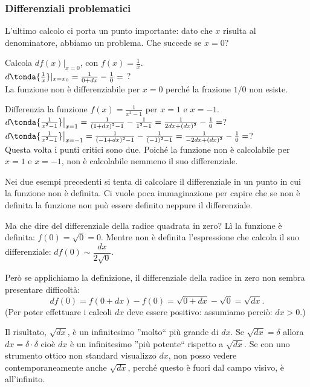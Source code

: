 \subsubsection{Differenziali problematici}
\label{subsubsec:diff01_diffproblemi}

L'ultimo calcolo ci porta un punto importante: dato che
$x$ risulta al denominatore, abbiamo un problema. Che succede se $x=0$?
\begin{esempio}
 Calcola $df(x)|_{x=0}$, con $f(x)=\frac{1}{x}$.\\
 $d\tonda{\frac{1}{x}}|_{x=x_0}=\frac{1}{0+dx}-\frac{1}{0}=$ ?\\
 La funzione non è differenziabile per $x=0$ perché la frazione \(1/0\) non 
esiste.
\end{esempio}

\begin{esempio}
Differenzia la funzione $f(x)=\frac{1}{x^2-1}$ per $x=1$ e $x=-1$.\\
$d\tonda{\frac{1}{x^2-1}}\big|_{x=1}=\frac{1}{(1+dx)^2-1}-\frac{1}{1^2-1}=
\frac{1}{2dx+(dx)^2}-\frac{1}{0}=$?\\
$d\tonda{\frac{1}{x^2-1}}\big|_{x=-1}=\frac{1}{(-1+dx)^2-1}-\frac{1}{(-1)^2-1}=
\frac{1}{-2dx+(dx)^2}-\frac{1}{0}=$?\\
Questa volta i punti critici sono due. Poiché la funzione non è calcolabile
per $x=1$ e $x=-1$, non è calcolabile nemmeno il suo differenziale.
\end{esempio}

Nei due esempi precedenti si tenta di calcolare il differenziale in un 
punto in cui la funzione non è definita. Ci vuole poca immaginazione per 
capire che se non è definita la funzione non può essere definito neppure il 
differenziale.

\begin{esempio}
Ma che dire del differenziale della radice quadrata in zero? Lì la funzione 
è definita: \(f(0)=\sqrt{0}=0\). 
Mentre non è definita l'espressione che calcola il suo differenziale: 
\(df(0) \sim \dfrac{dx}{2 \sqrt{0}}.\)

Però se applichiamo la definizione, il differenziale della radice in zero non 
sembra presentare difficoltà:
\[df(0) = f(0+dx)-f(0)=\sqrt{0+dx}-\sqrt{0}=\sqrt{dx}.\]
(Per poter effettuare i calcoli \(dx\) deve essere positivo: assumiamo perciò:
\(dx>0\).)

Il risultato, \(\sqrt{dx}\), è un infinitesimo ''molto`` più 
grande di \(dx\). 
Se \(\sqrt{dx} = \delta\) allora \(dx = \delta \cdot \delta\) cioè \(dx\) è 
un infinitesimo ''più potente`` rispetto a \(\sqrt{dx}\). Se con uno strumento 
ottico non standard  visualizzo \(dx\), non posso vedere contemporaneamente
anche \(\sqrt{dx}\), perché questo è fuori dal campo visivo, è all'infinito.
\end{esempio}


